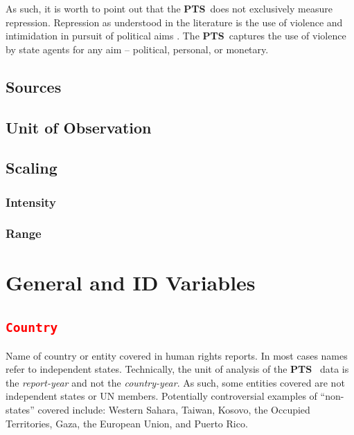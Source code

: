 \documentclass[11pt]{report}
\makeatletter
\def\Variables#1{\textcolor{red}{\texttt{#1}}{\index{#1@\texttt{#1}}}}
\newcommand{\PTS}{\textsf{\textbf{PTS}}}
\makeatother
\begin{document}
\noindent As such, it is worth to point out that the \PTS~does not exclusively measure repression. Repression as understood in the literature is the use of violence and intimidation in pursuit of political aims \citep{Tilly1978,Goldstein1978,Gurr1986,Haschke2014}. The \PTS~captures the use of violence by state agents for any aim -- political, personal, or monetary.


\section*{Sources}

\section*{Unit of Observation}

\section*{Scaling}

\subsection*{Intensity}

\subsection*{Range}



\chapter*{General and ID Variables}

\section*{\Variables{Country}}

Name of country or entity covered in human rights reports. In most cases names refer to independent states. Technically, the unit of analysis of the \PTS~ data is the \textit{report-year} and not the \textit{country-year}. As such, some entities covered are not independent states or UN members. Potentially controversial examples of ``non-states'' covered include: Western Sahara, Taiwan, Kosovo, the Occupied Territories, Gaza, the European Union, and Puerto Rico.
\end{document}
